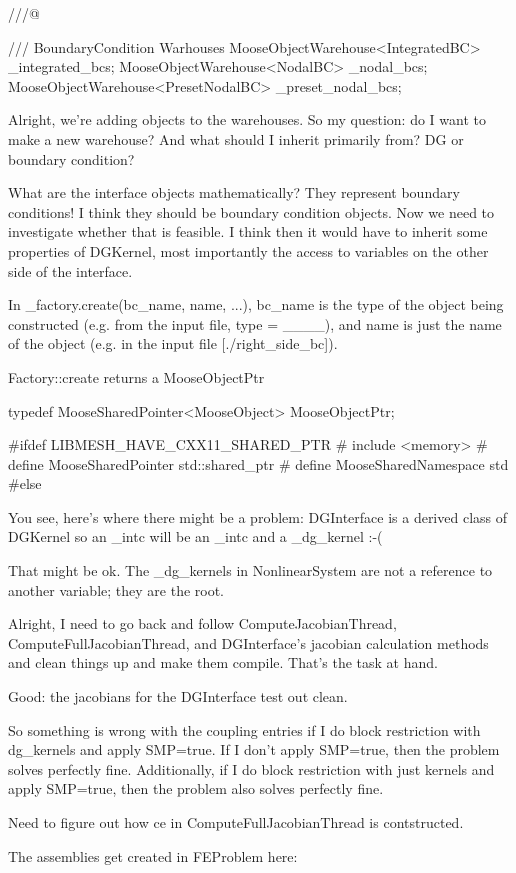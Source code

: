   ///@{
  /// BoundaryCondition Warhouses
  MooseObjectWarehouse<IntegratedBC> _integrated_bcs;
  MooseObjectWarehouse<NodalBC> _nodal_bcs;
  MooseObjectWarehouse<PresetNodalBC> _preset_nodal_bcs;

Alright, we're adding objects to the warehouses. So my question: do I want to make a new warehouse? And what should I inherit primarily from? DG or boundary condition?

What are the interface objects mathematically? They represent boundary conditions! I think they should be boundary condition objects. Now we need to investigate whether that is feasible. I think then it would have to inherit some properties of DGKernel, most importantly the access to variables on the other side of the interface.

In _factory.create(bc_name, name, ...), bc_name is the type of the object being constructed (e.g. from the input file, type = ____), and name is just the name of the object (e.g. in the input file [./right_side_bc]).

Factory::create returns a MooseObjectPtr

typedef MooseSharedPointer<MooseObject> MooseObjectPtr;

#ifdef LIBMESH_HAVE_CXX11_SHARED_PTR
#  include <memory>
#  define MooseSharedPointer std::shared_ptr
#  define MooseSharedNamespace std
#else

You see, here's where there might be a problem: DGInterface is a derived class of DGKernel so an _intc will be an _intc and a _dg_kernel :-(

That might be ok. The _dg_kernels in NonlinearSystem are not a reference to another variable; they are the root.

Alright, I need to go back and follow ComputeJacobianThread, ComputeFullJacobianThread, and DGInterface's jacobian calculation methods and clean things up and make them compile. That's the task at hand.

Good: the jacobians for the DGInterface test out clean.

So something is wrong with the coupling entries if I do block restriction with dg_kernels and apply SMP=true. If I don't apply SMP=true, then the problem solves perfectly fine. Additionally, if I do block restriction with just kernels and apply SMP=true, then the problem also solves perfectly fine.

Need to figure out how ce in ComputeFullJacobianThread is contstructed.

The assemblies get created in FEProblem here:

}
